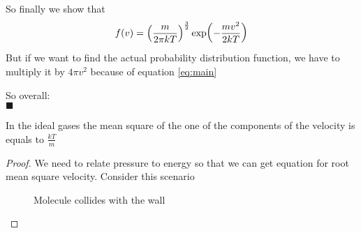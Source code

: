 \documentclass[a4paper, 12pt]{article}
\begin{document}
So finally we show that $$f(v)=\qty(\frac{m}{2\pi kT})^{\frac{3}{2}}\exp(-\frac{mv^2}{2kT})$$
But if we want to find the actual probability distribution function, we have to multiply it by $4\pi v^2$ because of equation \ref{eq:main}

So overall:
\\

\hskip 2in \hfill $\blacksquare$

\begin{lemma}\label{lem:1}
    In the ideal gases the mean square of the one of the components of the velocity is equals to $\frac{kT}{m}$
\end{lemma}
\begin{proof}     
    We need to relate pressure to energy so that we can get equation for root mean square
    velocity. Consider this scenario

    \begin{figure}[h!]
        \centering
        \caption{Molecule collides with the wall}
        \label{fig:elasticcol}
    \end{figure}


\end{proof}
\end{document}
